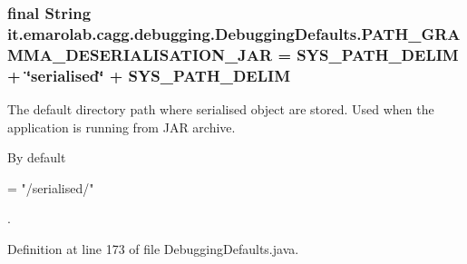 \hypertarget{classit_1_1emarolab_1_1cagg_1_1debugging_1_1DebuggingDefaults_aed5333ca1da4d785b5aedf6c3c47ed05}{
\subsubsection[{P\-A\-T\-H\-\_\-\-G\-R\-A\-M\-M\-A\-\_\-\-D\-E\-S\-E\-R\-I\-A\-L\-I\-S\-A\-T\-I\-O\-N\-\_\-\-J\-A\-R}]{\setlength{\rightskip}{0pt plus 5cm}final String it.\-emarolab.\-cagg.\-debugging.\-Debugging\-Defaults.\-P\-A\-T\-H\-\_\-\-G\-R\-A\-M\-M\-A\-\_\-\-D\-E\-S\-E\-R\-I\-A\-L\-I\-S\-A\-T\-I\-O\-N\-\_\-\-J\-A\-R = {\bf S\-Y\-S\-\_\-\-P\-A\-T\-H\-\_\-\-D\-E\-L\-I\-M} + \char`\"{}serialised\char`\"{} + S\-Y\-S\-\_\-\-P\-A\-T\-H\-\_\-\-D\-E\-L\-I\-M\hspace{0.3cm}{\ttfamily [static]}}}\label{classit_1_1emarolab_1_1cagg_1_1debugging_1_1DebuggingDefaults_aed5333ca1da4d785b5aedf6c3c47ed05}
The default directory path where serialised object are stored. Used when the application is running from J\-A\-R archive.\par
 By default
\begin{DoxyCode}
= \textcolor{stringliteral}{"/serialised/"} 
\end{DoxyCode}
 . 

Definition at line 173 of file Debugging\-Defaults.\-java.

